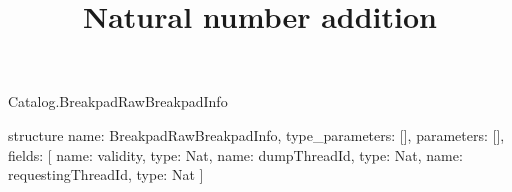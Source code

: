 \begin{lexlean}{Catalog.BreakpadRawBreakpadInfo}
\title{Natural number addition}
\begin{semanticmodule}
structure{
  name: BreakpadRawBreakpadInfo,
  type_parameters: [],
  parameters: [],
  fields: [
    {name: validity, type: Nat},
    {name: dumpThreadId, type: Nat},
    {name: requestingThreadId, type: Nat}
  ]
}
\end{semanticmodule}
\end{lexlean}
